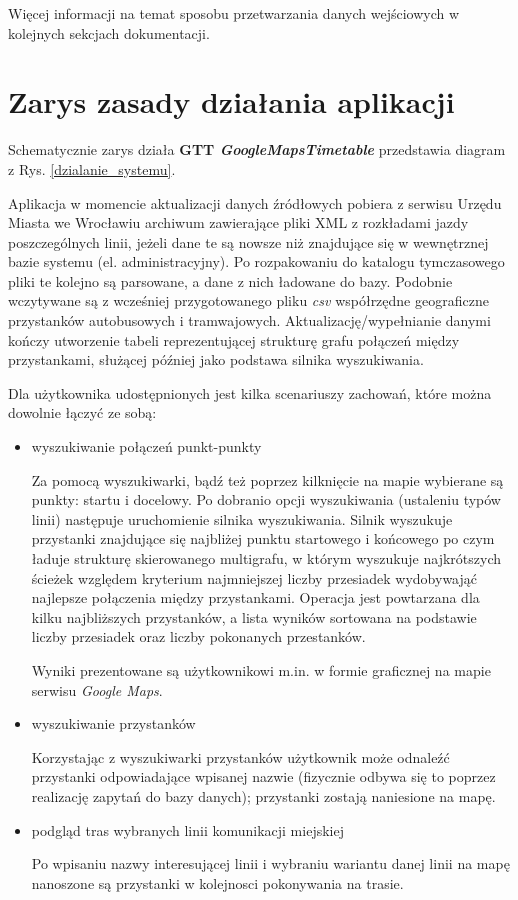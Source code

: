 \documentclass[a4paper,12pt]{article}
\begin{document}
Więcej informacji na temat sposobu przetwarzania danych wejściowych w kolejnych
sekcjach dokumentacji.

\section{Zarys zasady działania aplikacji}
Schematycznie zarys działa \textbf{GTT \emph{GoogleMapsTimetable}} przedstawia
diagram z Rys. \ref{dzialanie_systemu}. 

Aplikacja w momencie aktualizacji danych źródłowych pobiera z serwisu Urzędu
Miasta we Wrocławiu archiwum zawierające pliki XML z rozkładami jazdy
poszczególnych linii, jeżeli dane te są nowsze niż znajdujące się w wewnętrznej
bazie systemu (el. administracyjny). Po rozpakowaniu do katalogu tymczasowego
pliki te kolejno są parsowane, a dane z nich ładowane do bazy. Podobnie
wczytywane są z wcześniej przygotowanego pliku \emph{csv} współrzędne
geograficzne przystanków autobusowych i tramwajowych. Aktualizację/wypełnianie
danymi kończy utworzenie tabeli reprezentującej strukturę grafu połączeń między
przystankami, służącej później jako podstawa silnika wyszukiwania.

Dla użytkownika udostępnionych jest kilka scenariuszy zachowań, które można
dowolnie łączyć ze sobą:
\begin{itemize}
  \item wyszukiwanie połączeń punkt-punkty
  
  Za pomocą wyszukiwarki, bądź też poprzez kilknięcie na mapie wybierane są
  punkty: startu i docelowy. Po dobranio opcji wyszukiwania (ustaleniu typów
  linii) następuje uruchomienie silnika wyszukiwania. Silnik wyszukuje
  przystanki znajdujące się najbliżej punktu startowego i końcowego po
  czym  ładuje strukturę skierowanego multigrafu, w którym wyszukuje
  najkrótszych ścieżek względem kryterium najmniejszej liczby przesiadek
  wydobywająć najlepsze połączenia między przystankami. Operacja jest
  powtarzana dla kilku najbliższych przystanków, a lista wyników sortowana
 na podstawie liczby przesiadek oraz liczby pokonanych przestanków.
 
 Wyniki prezentowane są użytkownikowi m.in. w formie graficznej na mapie
 serwisu \emph{Google Maps}.
 \item wyszukiwanie przystanków
 
 Korzystając z wyszukiwarki przystanków użytkownik może odnaleźć przystanki
 odpowiadające wpisanej nazwie (fizycznie odbywa się to poprzez realizację
 zapytań do bazy danych); przystanki zostają naniesione na mapę.
 \item podgląd tras wybranych linii komunikacji miejskiej
 
 Po wpisaniu nazwy interesującej linii i wybraniu wariantu danej linii na mapę
 nanoszone są przystanki w kolejnosci pokonywania na trasie.
\end{itemize}
\end{document}
